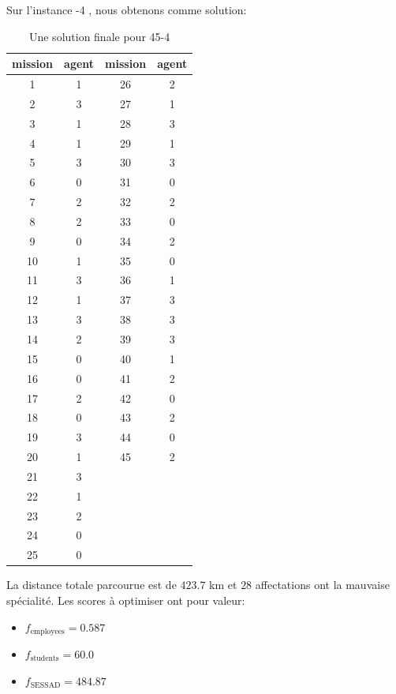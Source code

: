\documentclass[11pt]{article}
\begin{document}
Sur l'instance -4 \fg, nous obtenons comme solution:

\begin{table}[H]
    \centering
    \begin{tabular}{c|c c|c}
        mission & agent & mission & agent \\
        \hline
        1 & 1 & 26 & 2 \\
        2 & 3 & 27 & 1 \\
        3 & 1 & 28 & 3 \\
        4 & 1 & 29 & 1 \\
        5 & 3 & 30 & 3 \\
        6 & 0 & 31 & 0 \\
        7 & 2 & 32 & 2 \\
        8 & 2 & 33 & 0 \\
        9 & 0 & 34 & 2 \\
        10 & 1 & 35 & 0 \\
        11 & 3 & 36 & 1 \\
        12 & 1 & 37 & 3 \\
        13 & 3 & 38 & 3 \\
        14 & 2 & 39 & 3 \\
        15 & 0 & 40 & 1 \\
        16 & 0 & 41 & 2 \\
        17 & 2 & 42 & 0 \\
        18 & 0 & 43 & 2 \\
        19 & 3 & 44 & 0 \\
        20 & 1 & 45 & 2 \\
        21 & 3 & & \\
        22 & 1 & & \\
        23 & 2 & & \\
        24 & 0 & & \\
        25 & 0 & & \\
    \end{tabular}
    \caption{Une solution finale pour 45-4}
    \label{tab:45-4}
\end{table}

La distance totale parcourue est de $423.7$ km et $28$ affectations ont la mauvaise spécialité.
Les scores à optimiser ont pour valeur:

\begin{itemize}
    \item $f_{\text{employees}} = 0.587$
    \item $f_{\text{students}} = 60.0$
    \item $f_{\text{SESSAD}} = 484.87$
\end{itemize}
\end{document}

